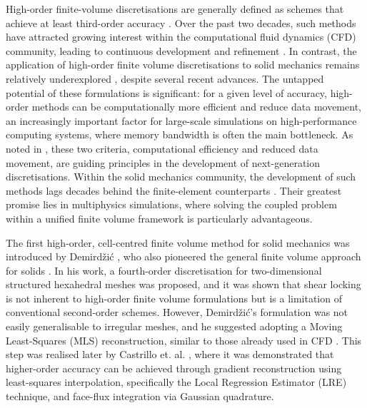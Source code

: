 \documentclass[review,3p]{elsarticle}
\begin{document}
%
%
%
%
High-order finite-volume discretisations are generally defined as schemes that achieve at least third-order accuracy \cite{wang2013}. Over the past two decades, such methods have attracted growing interest within the computational fluid dynamics (CFD) community, leading to continuous development and refinement \cite{Tsoutsanis2025, Nishikawa2025, Costa2022, Costa2023, Antoniadis2022}. In contrast, the application of high-order finite volume discretisations to solid mechanics remains relatively underexplored  \cite{Demirdzic2016, Castrillo2022, Castrillo2024}, despite several recent advances. The untapped potential of these formulations is significant: for a given level of accuracy, high-order methods can be computationally more efficient and reduce data movement, an increasingly important factor for large-scale simulations on high-performance computing systems, where memory bandwidth is often the main bottleneck. As noted in \cite{Tzanio2021}, these two criteria, computational efficiency and reduced data movement, are guiding principles in the development of next-generation discretisations. Within the solid mechanics community, the development of such methods lags decades behind the finite-element counterparts \cite{Bathe1996}. Their greatest promise lies in multiphysics simulations, where solving the coupled problem within a unified finite volume framework is particularly advantageous.

The first high-order, cell-centred finite volume method for solid mechanics was introduced by Demirdžić \cite{Demirdzic2016}, who also pioneered the general finite volume approach for solids \cite{Demirdzic1988, Cardiff2021}. In his work, a fourth-order discretisation for two-dimensional structured hexahedral meshes was proposed, and it was shown that shear locking is not inherent to high-order finite volume formulations but is a limitation of conventional second-order schemes. However, Demirdžić’s formulation was not easily generalisable to irregular meshes, and he suggested adopting a Moving Least-Squares (MLS) reconstruction, similar to those already used in CFD \cite{Felgueroso2007, Ramirez2014}. This step was realised later by Castrillo et. al. \cite{Castrillo2022, Castrillo2023}, where it was demonstrated that higher-order accuracy can be achieved through gradient reconstruction using least-squares interpolation, specifically the Local Regression Estimator (LRE) technique, and face-flux integration via Gaussian quadrature.
\end{document}
